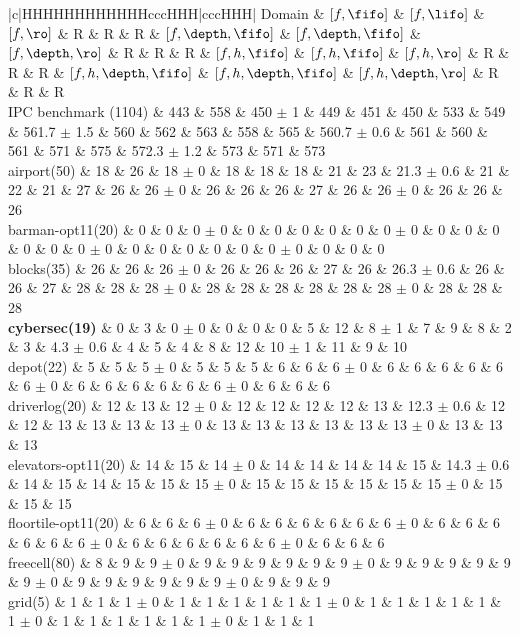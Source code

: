 \begin{center}
\begin{tabular}{|c|HHHHHHHHHHHHcccHHH|cccHHH|}
\hline
Domain & $[f,\fifo]$ & $[f,\lifo]$ & $[f,\ro]$ & R & R & R & $[f,\depth,\fifo]$ & $[f,\depth,\fifo]$ & $[f,\depth,\ro]$ & R & R & R & $[f,h,\fifo]$ & $[f,h,\fifo]$ & $[f,h,\ro]$ & R & R & R & $[f,h,\depth,\fifo]$ & $[f,h,\depth,\fifo]$ & $[f,h,\depth,\ro]$ & R & R & R\\
\hline
IPC benchmark (1104) & 443 & 558 & 450 $\pm$ 1 & 449 & 451 & 450 & 533 & 549 & 561.7 $\pm$ 1.5 & 560 & 562 & 563 & 558 & 565 & 560.7 $\pm$ 0.6 & 561 & 560 & 561 & 571 & 575 & 572.3 $\pm$ 1.2 & 573 & 571 & 573\\
\hline
airport(50) & 18 & 26 & 18 $\pm$ 0 & 18 & 18 & 18 & 21 & 23 & 21.3 $\pm$ 0.6 & 21 & 22 & 21 & 27 & 26 & 26 $\pm$ 0 & 26 & 26 & 26 & 27 & 26 & 26 $\pm$ 0 & 26 & 26 & 26\\
barman-opt11(20) & 0 & 0 & 0 $\pm$ 0 & 0 & 0 & 0 & 0 & 0 & 0 $\pm$ 0 & 0 & 0 & 0 & 0 & 0 & 0 $\pm$ 0 & 0 & 0 & 0 & 0 & 0 & 0 $\pm$ 0 & 0 & 0 & 0\\
blocks(35) & 26 & 26 & 26 $\pm$ 0 & 26 & 26 & 26 & 27 & 26 & 26.3 $\pm$ 0.6 & 26 & 26 & 27 & 28 & 28 & 28 $\pm$ 0 & 28 & 28 & 28 & 28 & 28 & 28 $\pm$ 0 & 28 & 28 & 28\\
\textbf{cybersec(19)} & 0 & 3 & 0 $\pm$ 0 & 0 & 0 & 0 & 5 & 12 & 8 $\pm$ 1 & 7 & 9 & 8 & 2 & 3 & 4.3 $\pm$ 0.6 & 4 & 5 & 4 & 8 & 12 & 10 $\pm$ 1 & 11 & 9 & 10\\
depot(22) & 5 & 5 & 5 $\pm$ 0 & 5 & 5 & 5 & 6 & 6 & 6 $\pm$ 0 & 6 & 6 & 6 & 6 & 6 & 6 $\pm$ 0 & 6 & 6 & 6 & 6 & 6 & 6 $\pm$ 0 & 6 & 6 & 6\\
driverlog(20) & 12 & 13 & 12 $\pm$ 0 & 12 & 12 & 12 & 12 & 13 & 12.3 $\pm$ 0.6 & 12 & 12 & 13 & 13 & 13 & 13 $\pm$ 0 & 13 & 13 & 13 & 13 & 13 & 13 $\pm$ 0 & 13 & 13 & 13\\
elevators-opt11(20) & 14 & 15 & 14 $\pm$ 0 & 14 & 14 & 14 & 14 & 15 & 14.3 $\pm$ 0.6 & 14 & 15 & 14 & 15 & 15 & 15 $\pm$ 0 & 15 & 15 & 15 & 15 & 15 & 15 $\pm$ 0 & 15 & 15 & 15\\
floortile-opt11(20) & 6 & 6 & 6 $\pm$ 0 & 6 & 6 & 6 & 6 & 6 & 6 $\pm$ 0 & 6 & 6 & 6 & 6 & 6 & 6 $\pm$ 0 & 6 & 6 & 6 & 6 & 6 & 6 $\pm$ 0 & 6 & 6 & 6\\
freecell(80) & 8 & 9 & 9 $\pm$ 0 & 9 & 9 & 9 & 9 & 9 & 9 $\pm$ 0 & 9 & 9 & 9 & 9 & 9 & 9 $\pm$ 0 & 9 & 9 & 9 & 9 & 9 & 9 $\pm$ 0 & 9 & 9 & 9\\
grid(5) & 1 & 1 & 1 $\pm$ 0 & 1 & 1 & 1 & 1 & 1 & 1 $\pm$ 0 & 1 & 1 & 1 & 1 & 1 & 1 $\pm$ 0 & 1 & 1 & 1 & 1 & 1 & 1 $\pm$ 0 & 1 & 1 & 1\\

\end{tabular}
\end{center}
